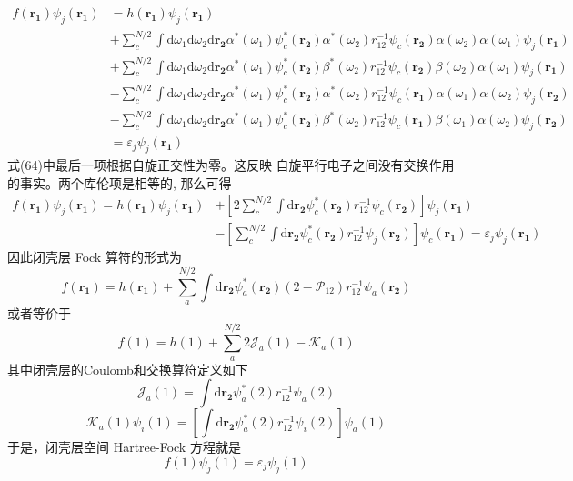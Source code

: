 \documentclass[]{article}
\begin{document}
\begin{align}
	f(\mathbf{r_1})\psi_j(\mathbf{r_1})
	&=h(\mathbf{r_1})\psi_j(\mathbf{r_1})\nonumber\\
	&+\sum\limits_{c}^{N/2}\int\mathrm{d}\omega_1\mathrm{d}\omega_2\mathrm{d}\mathbf{r_2}\alpha^*(\omega_1)\psi^*_c(\mathbf{r_2})\alpha^*(\omega_2)r_{12}^{-1}\psi_c(\mathbf{r_2})\alpha(\omega_2)\alpha(\omega_1)\psi_j(\mathbf{r_1})\nonumber\\
	&+\sum\limits_{c}^{N/2}\int\mathrm{d}\omega_1\mathrm{d}\omega_2\mathrm{d}\mathbf{r_2}\alpha^*(\omega_1)\psi^*_c(\mathbf{r_2})\beta^*(\omega_2)r_{12}^{-1}\psi_c(\mathbf{r_2})\beta(\omega_2)\alpha(\omega_1)\psi_j(\mathbf{r_1})\nonumber\\
	&-\sum\limits_{c}^{N/2}\int\mathrm{d}\omega_1\mathrm{d}\omega_2\mathrm{d}\mathbf{r_2}\alpha^*(\omega_1)\psi^*_c(\mathbf{r_2})\alpha^*(\omega_2)r_{12}^{-1}\psi_c(\mathbf{r_1})\alpha(\omega_1)\alpha(\omega_2)\psi_j(\mathbf{r_2})\nonumber\\
	&-\sum\limits_{c}^{N/2}\int\mathrm{d}\omega_1\mathrm{d}\omega_2\mathrm{d}\mathbf{r_2}\alpha^*(\omega_1)\psi^*_c(\mathbf{r_2})\beta^*(\omega_2)r_{12}^{-1}\psi_c(\mathbf{r_1})\beta(\omega_1)\alpha(\omega_2)\psi_j(\mathbf{r_2})\nonumber\\
	&=\varepsilon_j\psi_j(\mathbf{r_1})
\end{align}
式(64)中最后一项根据自旋正交性为零。这反映
自旋平行电子之间没有交换作用的事实。两个库伦项是相等的, 那么可得
\begin{align}
	f(\mathbf{r_1})\psi_j(\mathbf{r_1})=h(\mathbf{r_1})\psi_j(\mathbf{r_1})
	&+\left[ 2\sum\limits_{c}^{N/2}\int\mathrm{d}\mathbf{r_2}\psi^*_c(\mathbf{r_2})r_{12}^{-1}\psi_c(\mathbf{r_2})\right] \psi_j(\mathbf{r_1})\nonumber\\
	&-\left[ \sum\limits_{c}^{N/2}\int\mathrm{d}\mathbf{r_2}\psi^*_c(\mathbf{r_2})r_{12}^{-1}\psi_j(\mathbf{r_2})\right] \psi_c(\mathbf{r_1})=\varepsilon_j\psi_j(\mathbf{r_1})
\end{align}
因此闭壳层 Fock 算符的形式为
\begin{equation}
	f(\mathbf{r_1})=h(\mathbf{r_1})+\sum\limits_{a}^{N/2}\int\mathrm{d}\mathbf{r_2}\psi^*_a(\mathbf{r_2})(2-\mathscr{P}_{12})r_{12}^{-1}\psi_a(\mathbf{r_2})
\end{equation}
或者等价于
\begin{equation}
	f(1)=h(1)+\sum\limits_{a}^{N/2}2\mathscr{J}_a(1)-\mathscr{K}_a(1)
\end{equation}
其中闭壳层的Coulomb和交换算符定义如下
\begin{equation}
	\mathscr{J}_a(1)=\int\mathrm{d}\mathbf{r_2}\psi^*_a(2)r_{12}^{-1}\psi_a(2)
\end{equation}
\begin{equation}
	\mathscr{K}_a(1)\psi_i(1)=\left[ \int\mathrm{d}\mathbf{r_2}\psi^*_a(2)r_{12}^{-1}\psi_i(2)\right] \psi_a(1)
\end{equation}
于是，闭壳层空间 Hartree-Fock 方程就是
\begin{equation}
	f(1)\psi_j(1)=\varepsilon_j\psi_j(1)
\end{equation}
\end{document}
